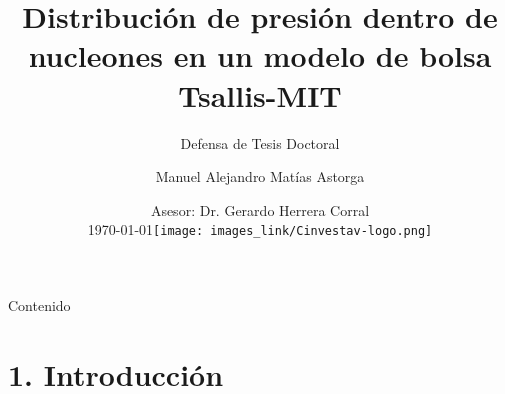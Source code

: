 \documentclass{beamer}
\title{Distribución de presión dentro de nucleones en un modelo de bolsa Tsallis-MIT}
\subtitle{Defensa de Tesis Doctoral}
\author{Manuel Alejandro Matías Astorga}
\date{
  \vspace{0.5em}
  Asesor: Dr. Gerardo Herrera Corral\\
  \today \hfill \texttt{[image: images\_link/Cinvestav-logo.png]}
}
\institute{CINVESTAV IPN}
\begin{document}
\maketitle

\begin{frame}[allowframebreaks]{Contenido}
  \tableofcontents
\end{frame}

\section[Introducción]{1. Introducción}
\end{document}
